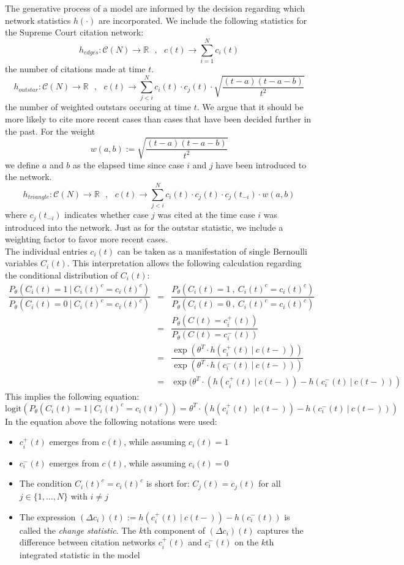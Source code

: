 \documentclass[headsepline=true, abstracton]{scrartcl}
\begin{document}
The generative process of a model are informed by
the decision regarding which network statistics $h(\cdot)$ are incorporated. We include the following statistics for the Supreme Court citation network:
$$h_{edges}:\mathcal{C}(N)\to \mathbb{R}~~~, ~~~c(t) \to \sum_{i=1}^Nc_i(t)$$
the number of citations made at time $t$. 
$$h_{outstar}:\mathcal{C}(N)\to \mathbb{R}~~~, ~~~c(t) \to \sum_{j<i}^Nc_i(t)\cdot c_j(t) \cdot \sqrt{\dfrac{(t-a)(t-a-b)}{t^2}}$$
the number of weighted outstars occuring at time $t$. We argue that it should be more likely to cite more recent cases than cases that have been decided further in the past. For the weight 
$$w(a,b):= \sqrt{\dfrac{(t-a)(t-a-b)}{t^2}}$$
we define $a$ and $b$ as the elapsed time since case $i$ and $j$ have been introduced to the network.
$$h_{triangle}:\mathcal{C}(N)\to \mathbb{R}~~~, ~~~c(t) \to \sum_{j<i}^Nc_i(t)\cdot c_j(t) \cdot
c_j(t_{-i}) \cdot w(a,b)$$
where $c_j(t_{-i})$ indicates whether case $j$ was cited at the time case $i$ was introduced into the network. Just as for the outstar statistic, we include a weighting factor to favor more recent cases. \\[0.3cm]


The individual entries $c_i(t)$ can be taken as a manifestation of single Bernoulli variables $C_i(t)$. This interpretation allows the following calculation regarding the conditional distribution of $C_i(t)$:
%
\begin{eqnarray*}
\dfrac{P_{\theta}(C_i(t)=1 ~|~ C_i(t)^c=c_i(t)^c)}{P_{\theta}(C_i(t)=0 ~|~ C_i(t)^c=c_i(t)^c)} &=&
\dfrac{P_{\theta}(C_i(t)=1 ~,~ C_i(t)^c=c_i(t)^c)}{P_{\theta}(C_i(t)=0 ~,~ C_i(t)^c=c_i(t)^c)} \\
                           &=&\dfrac{P_{\theta}(C(t)= c_i^+(t))}{P_{\theta}(C(t)=c_i^-(t))}\\
                           &=&\dfrac{\exp(\theta^T \cdot h(c_i^+(t)~|~c(t-)))}{\exp(\theta^T \cdot h(c_i^-(t)~|~c(t-)))}\\
                           &=& \exp(\theta^T \cdot (h(c_i^+(t)~|~c(t-)) - h(c_i^-(t)~|~c(t-)))
\end{eqnarray*}
%
This implies the following equation:
%
\begin{equation}
\text{logit}(P_{\theta}(C_i(t)=1 ~|~ C_i(t)^c=c_i(t)^c))= \theta^T \cdot (h(c_i^+(t)~~|c(t-)) - h(c_i^-(t)~|~c(t-)))
\label{Logit}
\end{equation}
In the equation above the following notations were used:
%
\begin{itemize}
\item $c_i^+(t)$ emerges from $c(t)$, while assuming $c_i(t)=1$
\item $c_i^-(t)$ emerges from $c(t)$, while assuming $c_i(t)=0$
\item The condition $C_i(t)^c=c_i(t)^c$ is short for: $C_j(t)=c_j(t)$ for all $j\in \{1,\dots,N\}$ with $i \neq j$
\item The expression $(\Delta c_i)(t):=h(c_i^+(t)~|~c(t-)) - h(c_i^-(t))$ is called the \textit{change statistic}. The $k$th component of $(\Delta c_i)(t)$ captures the difference between citation networks $c_i^+(t)$ and $c_i^-(t)$ on the $k$th integrated statistic in the model
\end{itemize}
\end{document}
